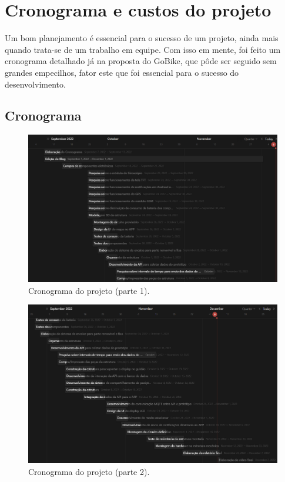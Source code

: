 \chapter{Cronograma e custos do projeto}
Um bom planejamento é essencial para o sucesso de um projeto, ainda mais quando trata-se de um trabalho em equipe. Com isso em mente, foi feito um cronograma detalhado já na proposta do GoBike, que pôde ser seguido sem grandes empecilhos, fator este que foi essencial para o sucesso do desenvolvimento. 

\section{Cronograma}

\begin{figure}[!h]
\centering
\includegraphics[width=15cm]{capitulos/Figuras/Cronograma1.png}
\caption{Cronograma do projeto (parte 1).}
\label{fig:cronograma_1}
\end{figure}

\newpage

\begin{figure}[!h]
\centering
\includegraphics[width=15cm]{capitulos/Figuras/Cronograma2.png}
\caption{Cronograma do projeto (parte 2).}
\label{fig:cronograma_2}
\end{figure}

